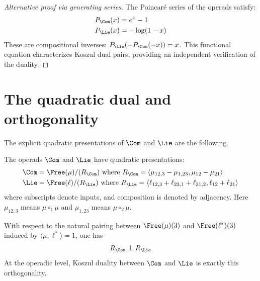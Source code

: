 \begin{proof}[Alternative proof via generating series]
The Poincaré series of the operads satisfy:
\begin{align}
P_{\Com}(x) &= e^x - 1 \\
P_{\Lie}(x) &= -\log(1 - x)
\end{align}
These are compositional inverses: $P_{\Lie}(-P_{\Com}(-x)) = x$. This functional equation characterizes Koszul dual pairs, providing an independent verification of the duality.
\end{proof}

\section{The quadratic dual and orthogonality}

The explicit quadratic presentations of $\Com$ and $\Lie$ are
the following.

\begin{proposition}\label{prop:quadratic-presentations-com-lie}
The operads $\Com$ and $\Lie$ have quadratic presentations:
\begin{align}
\Com &= \Free(\mu)/(R_{\Com}) \text{ where } R_{\Com} = \langle \mu_{12,3} - \mu_{1,23}, \mu_{12} - \mu_{21} \rangle \\
\Lie &= \Free(\ell)/(R_{\Lie}) \text{ where } R_{\Lie} = \langle \ell_{12,3} + \ell_{23,1} + \ell_{31,2}, \ell_{12} + \ell_{21} \rangle
\end{align}
where subscripts denote inputs, and composition is denoted by adjacency. Here $\mu_{12,3}$ means $\mu \circ_1 \mu$ and $\mu_{1,23}$ means $\mu \circ_2 \mu$.
\end{proposition}

\begin{proposition}\label{prop:orthogonal}
With respect to the natural pairing between $\Free(\mu)(3)$ and
$\Free(\ell^*)(3)$ induced by $\langle \mu, \ell^* \rangle = 1$, one has
\[
R_{\Com} \perp R_{\Lie}
\]
At the operadic level, Koszul duality between $\Com$ and $\Lie$
is exactly this orthogonality.
\end{proposition}

